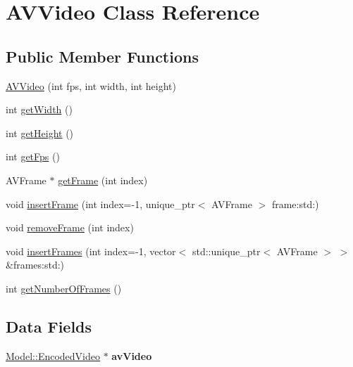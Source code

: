 \hypertarget{classModel_1_1AVVideo}{}\section{A\+V\+Video Class Reference}
\label{classModel_1_1AVVideo}
\subsection*{Public Member Functions}
\begin{DoxyCompactItemize}
\item 
\hyperlink{classModel_1_1AVVideo_af6a4a9766b45d8b9a6c10f0b6c5d8998}{A\+V\+Video} (int fps, int width, int height)
\item 
int \hyperlink{classModel_1_1AVVideo_a67a0997183f24da19b776d96c1052998}{get\+Width} ()
\item 
int \hyperlink{classModel_1_1AVVideo_a07efb2a4e9a982688c8bb3c3f21d1092}{get\+Height} ()
\item 
int \hyperlink{classModel_1_1AVVideo_a519ad5c0664b9de28c1a6d9dc77f959d}{get\+Fps} ()
\item 
A\+V\+Frame $\ast$ \hyperlink{classModel_1_1AVVideo_a5ae52bc55f8cdfa021eb1107beba5f61}{get\+Frame} (int index)
\item 
void \hyperlink{classModel_1_1AVVideo_ace104c676dbfe0dc570e75b8ed79c283}{insert\+Frame} (int index=-\/1, unique\+\_\+ptr$<$ A\+V\+Frame $>$ frame\+:std\+:)
\item 
void \hyperlink{classModel_1_1AVVideo_a2467a8d0c175fdcbacea59e9955d88a9}{remove\+Frame} (int index)
\item 
void \hyperlink{classModel_1_1AVVideo_af7a4bb4befc8330296b9765b4b23a7db}{insert\+Frames} (int index=-\/1, vector$<$ std\+::unique\+\_\+ptr$<$ A\+V\+Frame $>$ $>$ \&frames\+:std\+:)
\item 
int \hyperlink{classModel_1_1AVVideo_a038091d64aa83552571228512789d5ee}{get\+Number\+Of\+Frames} ()
\end{DoxyCompactItemize}
\subsection*{Data Fields}
\begin{DoxyCompactItemize}
\item 
\hypertarget{classModel_1_1AVVideo_a2ee559c7a937231b8bdc36ed5a15d865}{}\hyperlink{classModel_1_1EncodedVideo}{Model\+::\+Encoded\+Video} $\ast$ {\bfseries av\+Video}\label{classModel_1_1AVVideo_a2ee559c7a937231b8bdc36ed5a15d865}

\end{DoxyCompactItemize}


